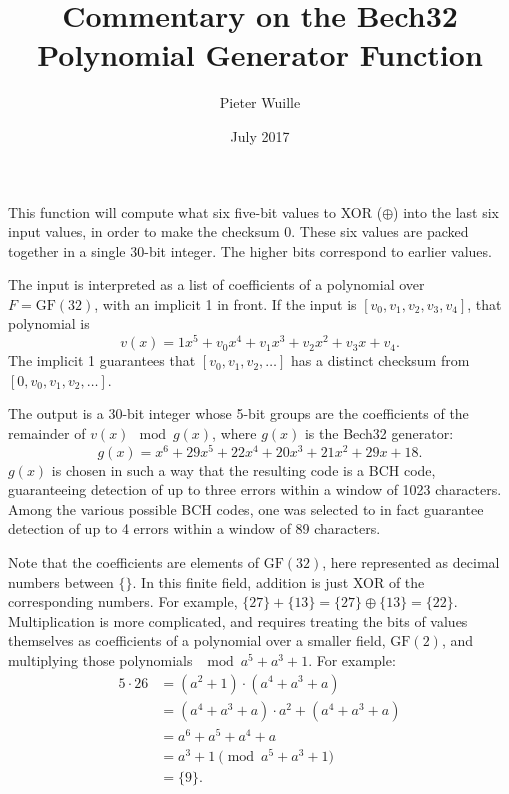 \documentclass[a4paper]{article}
\title{Commentary on the Bech32 Polynomial Generator Function}
\date{July 2017}
\author{Pieter Wuille}
\newcommand{\F}[1]{\mathrm{GF} ({#1})}
\newcommand{\be}[1]{\{{#1}\}}
\begin{document}
\maketitle
This function will compute what six five-bit values to XOR ($\oplus$) into the
last six input values, in order to make the checksum 0.
These six values are packed together in a single 30-bit integer.
The higher bits correspond to earlier values.
\begin{c++}[name=Code]
uint32_t polymod(const data& values)
{
\end{c++}
The input is interpreted as a list of coefficients of a polynomial over
$F = \F{32}$, with an implicit 1 in front. If the input is
$[v_0, v_1, v_2, v_3, v_4]$, that polynomial is
\begin{equation*}
	v(x) = 1x^5 + v_0x^4 + v_1x^3 + v_2x^2 + v_3x + v_4.
\end{equation*}
The implicit 1 guarantees that $[v_0, v_1, v_2, \ldots]$ has a distinct checksum
from $[0, v_0, v_1, v_2, \ldots]$.

The output is a 30-bit integer whose 5-bit groups are the coefficients of the
remainder of $v(x) \mod g(x)$, where $g(x)$ is the Bech32 generator:
\begin{equation}
  g(x) = x^6 + 29x^5 + 22x^4 + 20x^3 + 21x^2 + 29x + 18.
\end{equation}
$g(x)$ is chosen in such a way that the resulting code is a BCH code,
guaranteeing detection of up to three errors within a window of 1023 characters.
Among the various possible BCH codes, one was selected to in fact guarantee
detection of up to 4 errors within a window of 89 characters.

Note that the coefficients are elements of $\F{32}$, here represented as decimal
numbers between $\{\}$.
In this finite field, addition is just XOR of the corresponding numbers.
For example, $\be{27} + \be{13} = \be{27} \oplus \be{13} = \be{22}$.
Multiplication is more complicated, and requires treating the bits of values
themselves as coefficients of a polynomial over a smaller field, $\F{2}$, and
multiplying those polynomials $\mod a^5 + a^3 + 1$. 
For example:
\begin{align*}
	5 \cdot 26	&= (a^2 + 1) \cdot (a^4 + a^3 + a) \\
			&= (a^4 + a^3 + a) \cdot a^2 + (a^4 + a^3 + a) \\
			&= a^6 + a^5 + a^4 + a \\
			&= a^3 + 1 \pmod{a^5 + a^3 + 1} \\
      &= \be{9}.
\end{align*}
\end{document}

